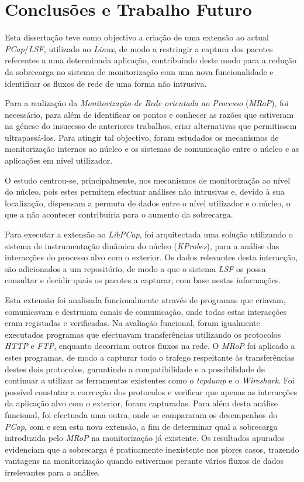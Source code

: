 \chapter{Conclusões e Trabalho Futuro}
\label{cap:conclusao}

Esta dissertação teve como objectivo a criação de uma extensão ao actual \textit{PCap}/\textit{LSF}, utilizado no \textit{Linux}, de modo a restringir a captura dos pacotes referentes a uma determinada aplicação, contribuindo deste modo para a redução da sobrecarga no sistema de monitorização com uma nova funcionalidade e identificar os fluxos de rede de uma forma não intrusiva.

Para a realização da \textit{Monitorização de Rede orientada ao Processo} (\textit{MRoP}), foi necessário, para além de identificar os pontos e conhecer as razões que estiveram na génese do insucesso de anteriores trabalhos, criar alternativas que permitissem ultrapassá-los.
Para atingir tal objectivo, foram estudados os mecanismos de monitorização internos ao núcleo e os sistemas de comunicação entre o núcleo e as aplicações em nível utilizador.

O estudo centrou-se, principalmente, nos mecanismos de monitorização ao nível do núcleo, pois estes permitem efectuar análises não intrusivas e, devido à sua localização, dispensam a permuta de dados entre o nível utilizador e o núcleo, o que a não acontecer contribuiria para o aumento da sobrecarga.

Para executar a extensão ao \textit{LibPCap}, foi arquitectada uma solução utilizando o sistema de instrumentação dinâmica do núcleo (\textit{KProbes}), para a análise das interacções do processo alvo com o exterior.
Os dados relevantes desta interacção, são adicionados a um repositório, de modo a que o sistema \textit{LSF} os possa consultar e decidir quais os pacotes a capturar, com base nestas informações.

Esta extensão foi analisada funcionalmente através de programas que criavam, comunicavam e destruiam canais de comunicação, onde todas estas interacções eram registadas e verificadas.
Na avaliação funcional, foram igualmente executados programas que efectuavam transferências utilizando os protocolos \textit{HTTP} e \textit{FTP}, enquanto decorriam outros fluxos na rede. 
O \textit{MRoP} foi aplicado a estes programas, de modo a capturar todo o trafego respeitante às transferências destes dois protocolos, garantindo a compatibilidade e a possibilidade de continuar a utilizar as ferramentas existentes como o \textit{tcpdump} e o \textit{Wireshark}.
Foi possível constatar a correcção dos protocolos e verificar que apenas as interacções da aplicação alvo com o exterior, foram capturadas.
Para além desta análise funcional, foi efectuada uma outra, onde se compararam os desempenhos do \textit{PCap}, com e sem esta nova extensão, a fim de determinar qual a sobrecarga introduzida pelo \textit{MRoP} na monitorização já existente.
Os resultados apurados evidenciam que a sobrecarga é praticamente inexistente nos piores casos, trazendo vantagens na monitorização quando estivermos perante vários fluxos de dados irrelevantes para a análise.

